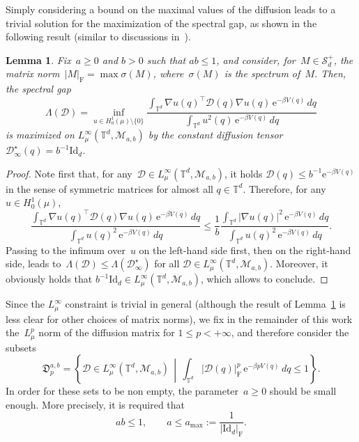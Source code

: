 \documentclass{article}
\newtheorem{lemma}{Lemma}
\newcommand{\dps}{\displaystyle }
\newcommand{\rme}{\mathrm{e}}
\newcommand{\Id}{\mathrm{Id}}
\renewcommand{\leq}{\leqslant}
\renewcommand{\geq}{\geqslant}
\def\T{\mathbb{T}}
\newcommand{\Diff}{\mathcal{D}}
\newcommand{\Diffset}{\mathfrak{D}}
\newcommand{\F}{\mathrm{F}}
\newcommand{\normF}[1]{\left| #1 \right|_{\F}}
\renewcommand{\dim}{d}
\begin{document}
Simply considering a bound on the maximal values of the diffusion leads to a trivial solution for the maximization of the spectral gap, as shown in the following result (similar to discussions in~\cite[Section~10.1]{Henrot}).

\begin{lemma}
  \label{lem:Malphabeta}
  Fix~$a \geq 0$ and $b >0$ such that $ab \leq 1$, and consider, for~$M \in \mathcal{S}_\dim^+$, the matrix norm~$\normF{M} = \max \sigma(M)$, where~$\sigma(M)$ is the spectrum of~$M$. Then, the spectral gap
  \[
  \Lambda(\Diff) = \inf_{u \in H^1_0(\mu) \setminus\{0\}} \frac{\dps \int_{\T^\dim}\nabla u(q)^\top \Diff(q)\nabla u(q) \, \rme^{-\beta V(q)} \, dq}{\dps \int_{\T^\dim} u^2(q) \, \rme^{-\beta V(q)}\,dq}
  \]
  is maximized on $L^{\infty}_{\mu}(\T^\dim,\mathcal{M}_{a,b})$ by the constant diffusion tensor~$\Diff_\infty^\star(q) = b^{-1} \Id_\dim$. 
\end{lemma}

\begin{proof}
  Note first that, for any~$\Diff \in L^{\infty}_{\mu}(\T^\dim,\mathcal{M}_{a,b})$, it holds $\Diff(q) \leq b^{-1} \rme^{-\beta V(q)}$ in the sense of symmetric matrices for almost all $q\in\T^\dim$. Therefore, for any~$u \in H^1_0(\mu)$,
  \[
  \frac{\dps \int_{\T^\dim}\nabla u(q)^\top \Diff(q)\nabla u(q) \, \rme^{-\beta V(q)} \, dq}{\dps \int_{\T^\dim} u(q)^2 \, \rme^{-\beta V(q)}\,dq} \leq \frac1b \frac{\dps \int_{\T^\dim} |\nabla u(q)|^2 \, \rme^{-\beta V(q)} \, dq}{\dps \int_{\T^\dim} u(q)^2 \, \rme^{-\beta V(q)}\,dq}.
  \]
  Passing to the infimum over~$u$ on the left-hand side first, then on the right-hand side, leads to~$\Lambda(\Diff)\leq \Lambda(\Diff_\infty^\star)$ for all $\Diff \in L^{\infty}_{\mu}(\T^\dim,\mathcal{M}_{a,b})$. Moreover, it obviously holds that $b^{-1}\Id_\dim \in L^{\infty}_{\mu}(\T^\dim,\mathcal{M}_{a,b})$, which allows to conclude.
\end{proof}

Since the $L_\mu^\infty$ constraint is trivial in general (although the result of Lemma~\ref{lem:Malphabeta} is less clear for other choices of matrix norms), we fix in the remainder of this work the~$L^p_\mu$ norm of the diffusion matrix for $1\leq p < +\infty$, and therefore consider the subsets
\begin{equation}
  \label{eq:constrained-set-matriciel}
  \Diffset_p^{a,b} = \left\{\Diff\in L^{\infty}_{\mu}(\T^\dim,\mathcal{M}_{a,b}) \,\middle|\, \int_{\T^\dim}\normF{\Diff(q)}^p \, \rme^{-\beta p V(q)} \, dq \leq 1 \right\}.
\end{equation}
In order for these sets to be non empty, the parameter~$a\geq 0$ should be small enough. More precisely, it is required that
\begin{equation}
  \label{eq:compatibility_conditions_continuous_level}
  ab \leq 1, \qquad a \leq a_\mathrm{max} := \frac{1}{\normF{\Id_d}}. 
\end{equation}
\end{document}
